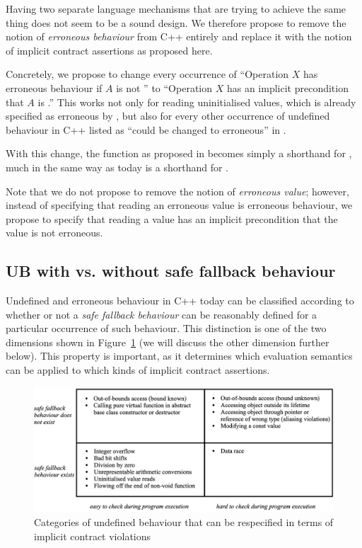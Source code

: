 Having two separate language mechanisms that are trying to achieve the same thing does not seem to be a sound design. We therefore propose to remove the notion of \emph{erroneous behaviour} from C++ entirely and replace it with the notion of implicit contract assertions as proposed here.

Concretely, we propose to change every occurrence of ``Operation $X$ has erroneous behaviour if $A$ is not '' to ``Operation $X$ has an implicit precondition that $A$ is .'' This works not only for reading uninitialised values, which is already specified as erroneous by \cite{P2795R5}, but also for every other occurrence of undefined behaviour in C++ listed as ``could be changed to erroneous'' in \cite{P2795R5}.

With this change, the function  as proposed in \cite{P3232R0} becomes simply a shorthand for , much in the same way as  today is a shorthand for .

Note that we do not propose to remove the notion of \emph{erroneous value}; however, instead of specifying that reading an erroneous value is erroneous behaviour, we propose to specify that reading a value has an implicit precondition that the value is not erroneous.

\subsection{UB with vs. without safe fallback behaviour}
\label{fallback}

Undefined and erroneous behaviour in C++ today can be classified according to whether or not a \emph{safe fallback behaviour} can be reasonably defined for a particular occurrence of such behaviour. This distinction is one of the two dimensions shown in Figure~\ref{fig_quadrants} (we will discuss the other dimension further below). This property is important, as it determines which evaluation semantics can be applied to which kinds of implicit contract assertions.

\begin{figure}[b]
\begin{center}
\includegraphics[scale=0.32]{images/p3100_quadrants.png}
\end{center}
\caption{Categories of undefined behaviour that can be respecified in terms of implicit contract violations}
\label{fig_quadrants}
\end{figure}

